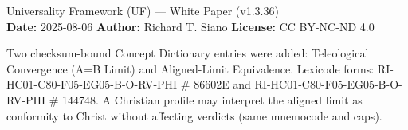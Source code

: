 \documentclass[11pt]{article}
\begin{document}
\begin{center}
{\LARGE Universality Framework (UF) --- White Paper (v1.3.36)}\\[6pt]
\textbf{Date: }2025-08-06 \quad \textbf{Author: }Richard T. Siano \quad \textbf{License: }CC BY-NC-ND 4.0
\end{center}
\noindent Two checksum-bound Concept Dictionary entries were added: Teleological Convergence (A=B Limit) and Aligned-Limit Equivalence. Lexicode forms: RI-HC01-C80-F05-EG05-B-O-RV-PHI \# 86602E and RI-HC01-C80-F05-EG05-B-O-RV-PHI \# 144748. A Christian profile may interpret the aligned limit as conformity to Christ without affecting verdicts (same mnemocode and caps).
\end{document}
